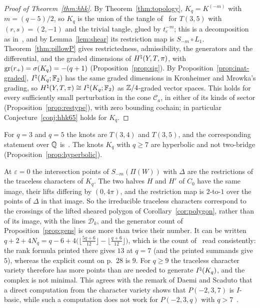 \begin{proof}[Proof of Theorem~\ref{thm:hhk}]
By Theorem~\ref{thm:topology}, $K_q=K^{(-m)}$ with $m=(q-5)/2$, so $K_q$ is the union of the tangle of~\cite[\S10]{HHK2} for
$T(3,5)$ with $(r,s)=(2,-1)$ and the trivial tangle, glued by $t_e^{-m}$; this is a decomposition as
in~\cite[(17)]{HHK2}, and by Lemma~\ref{lem:shear} its restriction map is $S_{-m}\circ L_1$. Theorem~\ref{thm:pillowP} gives
restrictedness, admissibility, the generators and the differential, and the graded dimensions of $H^{\natural}(Y,T,\pi)$, with
$\operatorname{gr}(r_+)=\sigma(K_q)=-(q+1)$ (Proposition~\ref{prop:sig}). By Proposition~\ref{prop:inat-graded}, $I^{\natural}(K_q;\mathbb{F}_2)$ has the same
graded dimensions in Kronheimer and Mrowka's grading, so $H^{\natural}(Y,T,\pi)\cong I^{\natural}(K_q;\mathbb{F}_2)$ as $\mathbb{Z}/4$-graded vector spaces.
This holds for every sufficiently small perturbation in the cone $\mathcal C_a$, in either of its kinds of sector
(Proposition~\ref{prop:restype}), with zero bounding cochain; in particular Conjecture~\ref{conj:hhk65} holds for $K_q$.
\end{proof}

For $q=3$ and $q=5$ the knots are $T(3,4)$ and $T(3,5)$, and the corresponding statement over $\mathbb{Q}$ is~\cite[Thm.~1.1,
Cor.~1.2]{WuebbenV}. The knots $K_q$ with $q\ge7$ are hyperbolic and not two-bridge (Proposition~\ref{prop:hyperbolic}).

\begin{remark}\label{rem:FKPcount}
At $\varepsilon=0$ the intersection points of $S_{-m}(\Pi(W))$ with $\Delta$ are the restrictions of the traceless characters of $K_q$.
The two halves $H$ and $H'$ of $C_0$ have the same image, their lifts differing by $(0,4\pi)$, and the restriction map is
$2$-to-$1$ over the points of $\Delta$ in that image. So the irreducible traceless characters correspond to the crossings of
the lifted sheared polygon of Corollary~\ref{cor:polygon}, rather than of its image, with the lines $\mathcal D_k$, and the
generator count of Proposition~\ref{prop:gens} is one more than twice their number. It can be written
$q+2+4N_q=q-6+4\bigl(\lfloor\frac{5q+6}{12}\rfloor-\lfloor\frac{q+6}{12}\rfloor\bigr)$, which is the count of~\cite[\S5, p.~29]{FKP}
read consistently: the rank formula printed there gives $13$ at $q=7$ (and the printed summands give $5$), whereas the
explicit count on p.~28 is $9$. For $q\ge9$ the traceless character variety therefore has more points than are needed to generate $I^{\natural}(K_q)$, and
the complex is not minimal. This agrees with the remark of
Daemi and Scaduto that a direct computation from the character variety shows that $P(-2,3,7)$ is $I$-basic, while
such a computation does not work for $P(-2,3,q)$ with $q>7$~\cite[p.~161]{DS24}.
\end{remark}

